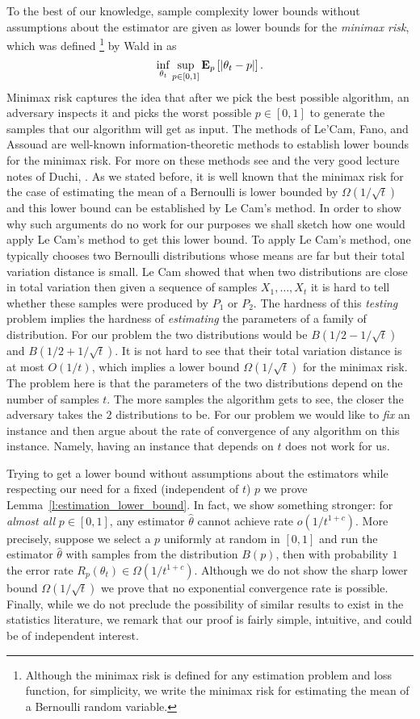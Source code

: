To the best of our knowledge, sample complexity lower bounds without
assumptions about the estimator are given as lower bounds for the
\emph{minimax risk}, which was defined
\footnote{
Although the minimax risk is defined for any estimation problem and loss
function, for simplicity, we write the minimax risk for estimating the mean
of a Bernoulli random variable.}
  by Wald in \cite{Wal39} as
\[
  \inf_{\theta_t} \sup_{p\in[0,1]} \bm{\mathrm{E}}_{p} \left[ |\theta_t - p| \right].
\]
Minimax risk captures the idea that after we pick the best possible
algorithm, an adversary inspects it and picks the worst possible
$p \in[0,1]$ to generate the samples that our algorithm will get as input.
The methods of Le'Cam, Fano, and Assouad are well-known
information-theoretic methods to establish lower bounds for the minimax risk.
For more on these methods see \cite{Yu97, Tsy08} and the
very good lecture notes of Duchi, \cite{duchi_stats311}.
As we stated before, it is well known that the minimax risk for the
case of estimating the mean of a Bernoulli is lower bounded by
$\Omega(1/\sqrt{t})$ and this lower bound can be established
by Le Cam's method.
In order to show why such arguments do no work for our purposes
we shall sketch how one would apply Le Cam's method to get this lower bound.
To apply Le Cam's method, one typically chooses two Bernoulli distributions
whose means are far but their total variation distance is small.
Le Cam showed that when two distributions are close in total variation then
given a sequence of samples $X_1, \ldots, X_t$ it is hard to tell whether
these samples were produced by $P_1$ or $P_2$. The hardness of this \emph{testing}
problem implies the hardness of \emph{estimating} the parameters of
a family of distribution.
For our problem the two distributions would be $B(1/2 - 1/\sqrt{t})$
and $B(1/2 + 1/\sqrt{t})$. It is not hard to see that their total variation
distance is at most $O(1/t)$, which implies a lower bound
$\Omega(1/\sqrt{t})$ for the minimax risk. The problem here is that
the parameters of the two distributions depend on the number of
samples $t$. The more samples the algorithm gets to see, the closer
the adversary takes the $2$ distributions to be.
For our problem we would like to \emph{fix} an instance and then argue
about the rate of convergence of any algorithm on this instance.
Namely, having an instance that depends on $t$ does not work for us.

Trying to get a lower bound without assumptions about the estimators
while respecting our need for a fixed (independent of $t$) $p$ we prove
Lemma~\ref{l:estimation_lower_bound}.
In fact, we show something stronger:
for \emph{almost all} $p \in [0,1]$, any estimator $\hat{\theta}$ cannot
achieve rate $o(1/t^{1+c})$.
More precisely,  suppose we select a $p$ uniformly at
random in $[0,1]$ and run the estimator $\hat{\theta}$ with samples from the
distribution $B(p)$, then with probability $1$ the error rate $R_p(\theta_t) \in
\Omega(1/t^{1+c})$. Although we do not show the sharp lower bound
$\Omega(1/\sqrt{t})$ we prove that no exponential convergence rate
is possible.
Finally, while we do not preclude the possibility of similar results to exist
in the statistics literature, we remark that our proof is fairly simple,
intuitive, and could be of independent interest.


